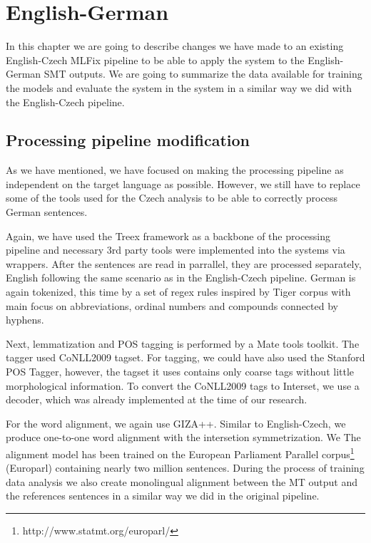 \chapter{English-German}
\label{chap:german}

In this chapter we are going to describe changes we have made to an existing
English-Czech MLFix pipeline to be able to apply the system to the English-German
SMT outputs. We are going to summarize the data available for training the models
and evaluate the system in the system in a similar way we did with the English-Czech
pipeline.

\section{Processing pipeline modification}

As we have mentioned, we have focused on making the processing pipeline as independent
on the target language as possible. However, we still have to replace some of the tools
used for the Czech analysis to be able to correctly process German sentences.

Again, we have used the Treex framework as a backbone of the processing pipeline and
necessary 3rd party tools were implemented into the systems via wrappers.
After the sentences are read in parrallel, they are processed separately, English
following the same scenario as in the English-Czech pipeline.
German is again tokenized, this time by a set of regex rules inspired by Tiger corpus\cite{Brants2004}
with main focus on abbreviations, ordinal numbers and compounds connected by hyphens.

Next, lemmatization and POS tagging is performed by a Mate tools
toolkit. The tagger used CoNLL2009\cite{CoNLL-2009-ST} tagset. For tagging, we could have also
used the Stanford POS Tagger\cite{Toutanova:2000:EKS:1117794.1117802},
however, the tagset it uses contains only coarse tags without little morphological information.
To convert the CoNLL2009 tags to Interset, we use a decoder, which was already implemented at the
time of our research.

For the word alignment, we again use GIZA++. Similar to English-Czech, we produce one-to-one word alignment
with the intersetion symmetrization. We The alignment model has been trained on the European
Parliament Parallel corpus\cite{koehn2005epc}\footnote{http://www.statmt.org/europarl/} (Europarl)
containing nearly two million sentences. During the process of training data analysis we 
also create monolingual alignment between the MT output and the references sentences
in a similar way we did in the original pipeline.

